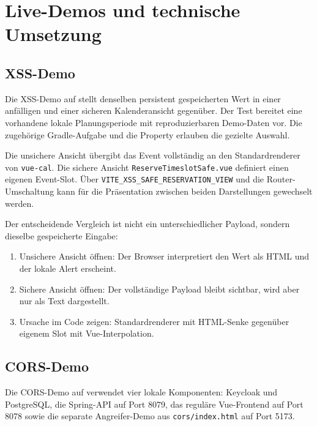 \section{Live-Demos und technische Umsetzung}
\label{sec:demo}

\subsection{XSS-Demo}

Die XSS-Demo auf  stellt
denselben persistent gespeicherten Wert in einer anfälligen und einer
sicheren Kalenderansicht gegenüber. Der Test
bereitet eine vorhandene lokale Planungsperiode mit reproduzierbaren
Demo-Daten vor. Die zugehörige Gradle-Aufgabe 
und die Property  erlauben die gezielte Auswahl.

Die unsichere Ansicht übergibt das Event vollständig an den
Standardrenderer von \texttt{vue-cal}. Die sichere Ansicht
\texttt{ReserveTimeslotSafe.vue} definiert einen eigenen Event-Slot.
Über \texttt{VITE\_XSS\_SAFE\_RESERVATION\_VIEW} und die
Router-Umschaltung kann für die Präsentation zwischen beiden
Darstellungen gewechselt werden.

Der entscheidende Vergleich ist nicht ein unterschiedlicher Payload,
sondern dieselbe gespeicherte Eingabe:

\begin{enumerate}
  \item Unsichere Ansicht öffnen: Der Browser interpretiert den Wert
    als HTML und der lokale Alert erscheint.
  \item Sichere Ansicht öffnen: Der vollständige Payload bleibt
    sichtbar, wird aber nur als Text dargestellt.
  \item Ursache im Code zeigen: Standardrenderer mit HTML-Senke
    gegenüber eigenem Slot mit Vue-Interpolation.
\end{enumerate}

\subsection{CORS-Demo}

Die CORS-Demo auf  verwendet
vier lokale Komponenten: Keycloak und PostgreSQL, die Spring-API auf
Port 8079, das reguläre Vue-Frontend auf Port 8078 sowie die separate
Angreifer-Demo aus \texttt{cors/index.html} auf Port 5173.

